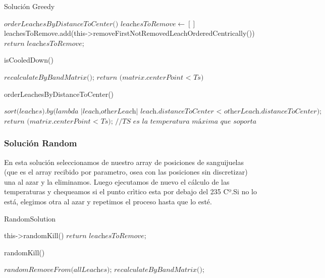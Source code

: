 \newpage

\begin{algorithm}
\caption{Solución Greedy}\label{euclid}
\begin{algorithmic}[1]
\State $\textit{orderLeachesByDistanceToCenter()}$
\State $\textit{leachesToRemove} \gets []$
\Do
    \State leachesToRemove.add(this->removeFirstNotRemovedLeachOrderedCentrically())
\State $\textit{return leachesToRemove;}$
\end{algorithmic}
\end{algorithm}

\begin{algorithm}
\caption{isCooledDown()}\label{euclid}
\begin{algorithmic}[1]
\State $\textit{recalculateByBandMatrix();}$
\State $\textit{return (matrix.centerPoint < Ts)}$ 
\end{algorithmic}
\end{algorithm}

\begin{algorithm}
\caption{orderLeachesByDistanceToCenter()}\label{euclid}
\begin{algorithmic}[1]
\State $\textit{sort(leaches).by(lambda {|leach,otherLeach| leach.distanceToCenter < otherLeach.distanceToCenter});}$
\State $\textit{return (matrix.centerPoint < Ts); //TS es la temperatura máxima que soporta el centro}$
\end{algorithmic}
\end{algorithm}

\subsubsection{Solución Random}\label{sec:solucionRandom}
En esta solución seleccionamos de nuestro array de posiciones de sanguijuelas (que es el array recibido por parametro, osea con las posiciones sin discretizar) una al azar y la eliminamos. Luego ejecutamos de nuevo el cálculo de las temperaturas y chequeamos si el punto crìtico esta por debajo del 235 Cº.Si no lo está, elegimos otra al azar y repetimos el proceso hasta que lo esté. 

\begin{algorithm}
\caption{RandomSolution}\label{euclid}
\begin{algorithmic}[1]
\Do
    \State this->randomKill()
\State $\textit{return leachesToRemove;}$
\end{algorithmic}
\end{algorithm}

\begin{algorithm}
\caption{randomKill()}\label{euclid}
\begin{algorithmic}[1]
\State $\textit{randomRemoveFrom(allLeaches);}$ 
\State $\textit{recalculateByBandMatrix();}$
\end{algorithmic}
\end{algorithm}

